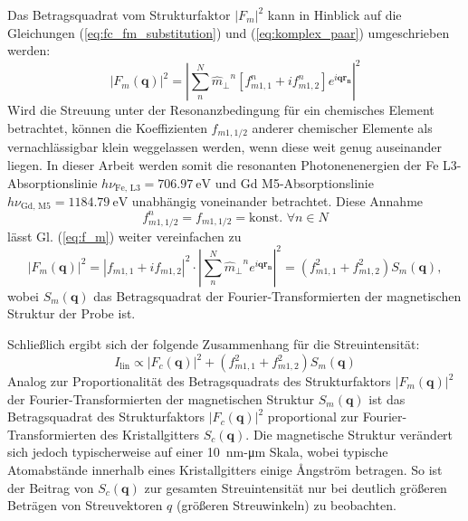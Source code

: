 \noindent
Das Betragsquadrat vom Strukturfaktor $\left|F_m\right|^2$ kann in Hinblick auf die Gleichungen (\ref{eq:fc_fm_substitution}) und (\ref{eq:komplex_paar}) umgeschrieben werden:
\begin{equation}
    \left|F_m(\mathbf{q})\right|^2 =  \left|\sum^N_n {\hat{m}_\perp}^n \left[f_{m1,1}^n + if_{m1,2}^n\right] e^{i\mathbf{qr_n}}\right|^2
    \label{eq:f_m}
\end{equation}
Wird die Streuung unter der Resonanzbedingung für ein chemisches Element betrachtet, können die Koeffizienten $f_{m1,1/2}$ anderer chemischer Elemente als vernachlässigbar klein weggelassen werden, wenn diese weit genug auseinander liegen. In dieser Arbeit werden somit die resonanten Photonenenergien der Fe L3-Absorptionslinie $h\nu_{\text{Fe, L3}} = \SI{706.97}{\eV}$ und Gd M5-Absorptionslinie $h\nu_{\text{Gd, M5}} = \SI{1184.79}{\eV}$ unabhängig voneinander betrachtet. Diese Annahme
\begin{equation}
    f_{m1,1/2}^n = f_{m1,1/2} = \text{konst. } \forall n \in N
\end{equation}
lässt Gl. (\ref{eq:f_m}) weiter vereinfachen zu
\begin{equation}
   \left|F_m(\mathbf{q})\right|^2 = \left|f_{m1,1} + if_{m1,2}\right|^2 \cdot \left|\sum^N_n {\hat{m}_\perp}^n e^{i\mathbf{qr_n}}\right|^2 = \left(f_{m1,1}^2 + f_{m1,2}^2\right)S_m(\mathbf{q}),
\end{equation}
wobei $S_m(\mathbf{q})$ das Betragsquadrat der Fourier-Transformierten der magnetischen Struktur der Probe ist.

\noindent
Schließlich ergibt sich der folgende Zusammenhang für die Streuintensität:
\begin{equation}
    I_{\text{lin}} \propto  \left| F_c(\mathbf{q}) \right|^2 + \left(f_{m1,1}^2 + f_{m1,2}^2\right)S_m(\mathbf{q})
    \label{eq:intensitat_fourier}
\end{equation}
\noindent
Analog zur Proportionalität des Betragsquadrats des Strukturfaktors $\left|F_m(\mathbf{q})\right|^2$ der Fourier-Trans\-for\-mier\-ten der magnetischen Struktur $S_m(\mathbf{q})$ ist das Betragsquadrat des Strukturfaktors $\left|F_c(\mathbf{q})\right|^2$ proportional zur Fourier-Transformierten des Kristallgitters $S_c(\mathbf{q})$. Die magnetische Struktur verändert sich jedoch typischerweise auf einer \SI{10}{\nano\meter}-\si{\micro\meter} Skala, wobei typische Atomabstände innerhalb eines Kristallgitters einige Ångström betragen. So ist der Beitrag von $S_c(\mathbf{q})$ zur gesamten Streuintensität nur bei deutlich größeren Beträgen von Streuvektoren $q$ (größeren Streuwinkeln) zu beobachten.%


